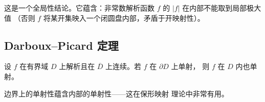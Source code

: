 \begin{remark}
这是一个全局性结论。它蕴含：非常数解析函数 $f$ 的 $|f|$ 在内部不能取到局部极大值
（否则 $f$ 将某开集映入一个闭圆盘内部，矛盾于开映射性）。
\end{remark}

\subsection{Darboux--Picard 定理}

\begin{theorem}
设 $f$ 在有界域 $D$ 上解析且在 $\overline{D}$ 上连续。若 $f$ 在 $\partial D$ 上单射，
则 $f$ 在 $D$ 内也单射。
\end{theorem}

\begin{remark}
边界上的单射性蕴含内部的单射性——这在保形映射  理论中非常有用。
\end{remark}
